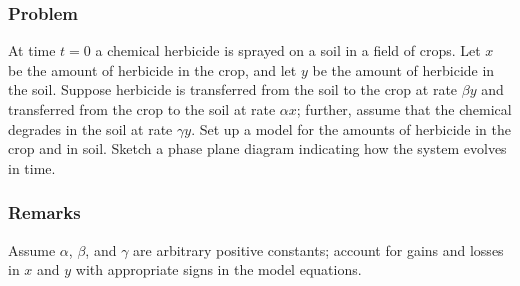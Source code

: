 \documentclass[12pt]{article}
\begin{document}
\subsubsection*{Problem}
At time $t=0$ a chemical herbicide is sprayed on a soil in a field of crops. Let
$x$ be the amount of herbicide in the crop, and let $y$ be the amount of
herbicide in the soil. Suppose herbicide is transferred from the soil to the
crop at rate $\beta y$ and transferred from the crop to the soil at rate $\alpha
x$; further, assume that the chemical degrades in the soil at rate $\gamma y$.
Set up a model for the amounts of herbicide in the crop and in soil. Sketch a
phase plane diagram indicating how the system evolves in time.
\subsubsection*{Remarks}
Assume $\alpha$, $\beta$, and $\gamma$ are arbitrary positive constants; account
for gains and losses in $x$ and $y$ with appropriate signs in the model
equations.
\end{document}
